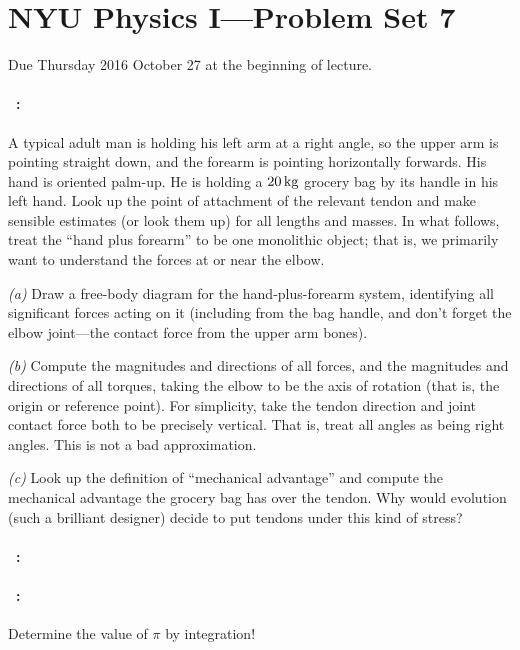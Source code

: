 \documentclass[12pt]{article}
\begin{document}
\section*{NYU Physics I---Problem Set 7}

Due Thursday 2016 October 27 at the beginning of lecture.

\paragraph{\problemname~\theproblem:}%
A typical adult man is holding his left arm at a right angle, so the
upper arm is pointing straight down, and the forearm is pointing
horizontally forwards.  His hand is oriented palm-up.  He is holding a
$20\,\mathrm{kg}$ grocery bag by its handle in his left hand.  Look up the
point of attachment of the relevant tendon and make sensible estimates
(or look them up) for all lengths and masses.  In what follows, treat
the ``hand plus forearm'' to be one monolithic object; that is, we
primarily want to understand the forces at or near the elbow.

\textsl{(a)} Draw a free-body diagram for the hand-plus-forearm
system, identifying all significant forces acting on it (including
from the bag handle, and don't forget the elbow joint---the contact
force from the upper arm bones).

\textsl{(b)} Compute the magnitudes and directions of all forces, and
the magnitudes and directions of all torques, taking the elbow to be
the axis of rotation (that is, the origin or reference point).  For
simplicity, take the tendon direction and joint contact force both to
be precisely vertical.  That is, treat all angles as being right
angles.  This is not a bad approximation.

\textsl{(c)} Look up the definition of ``mechanical advantage'' and
compute the mechanical advantage the grocery bag has over the tendon.
Why would evolution (such a brilliant designer) decide to put tendons
under this kind of stress?

\paragraph{\problemname~\theproblem:}%


\paragraph{\problemname~\theproblem:}%
Determine the value of $\pi$ by integration!
\end{document}
